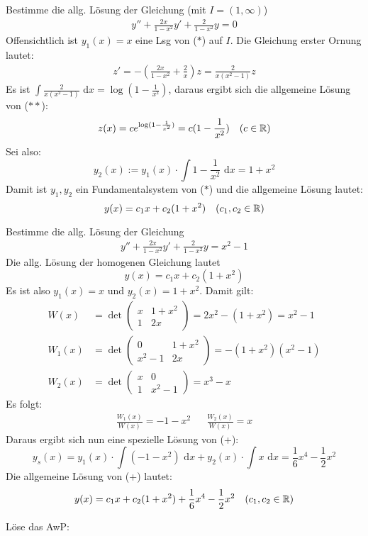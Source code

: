 \documentclass[a4paper,twoside,DIV15,BCOR12mm,chapterprefix=true,headings=twolinechapter]{scrbook}
\begin{document}
\begin{beispiele}
\item Bestimme die allg. Lösung der Gleichung (mit $I=(1,\infty)$)
\begin{align*}
\tag{$*$} y''+\frac{2x}{1-x^2}y'+\frac{2}{1-x^2}y=0
\end{align*}
Offensichtlich ist $y_1(x)=x$ eine Lsg von ($*$) auf $I$. Die Gleichung erster Ornung lautet:
\begin{align*}
\tag{$**$} z'=-\left(\frac{2x}{1-x^2}+\frac 2x\right)z=\frac 2{x(x^2-1)} z
\end{align*}
Es ist $\int\frac2{x(x^2-1)}\text{ d}x=\log(1-\frac1{x^2})$, daraus ergibt sich die allgemeine
Lösung von ($**$):
\[z(x)=ce^{\log(1-\frac1{x^2})}=c(1-\frac1{x^2})\quad (c\in\mathbb{R})\]
Sei also:
\[y_2(x):=y_1(x)\cdot\int 1-\frac1{x^2}\text{ d}x=1+x^2\]
Damit ist $y_1,y_2$ ein Fundamentalsystem von ($*$) und die allgemeine Lösung lautet:
\[y(x)=c_1x+c_2(1+x^2)\quad (c_1,c_2\in\mathbb{R})\]
\item Bestimme die allg. Lösung der Gleichung
\begin{align*}
\tag{+} y''+\frac{2x}{1-x^2}y'+\frac{2}{1-x^2}y=x^2-1
\end{align*}
Die allg. Lösung der homogenen Gleichung lautet
\[y(x)=c_1x+c_2(1+x^2)\]
Es ist also $y_1(x)=x$ und $y_2(x)=1+x^2$. Damit gilt:
\begin{align*}
W(x)&=\det\begin{pmatrix}
x&1+x^2\\
1&2x
\end{pmatrix}=2x^2-(1+x^2)=x^2-1\\
W_1(x)&=\det\begin{pmatrix}
0&1+x^2\\
x^2-1&2x
\end{pmatrix}=-(1+x^2)(x^2-1)\\
W_2(x)&=\det\begin{pmatrix}
x&0\\
1&x^2-1	
\end{pmatrix}=x^3-x
\end{align*}
Es folgt:
\begin{align*}
\frac{W_1(x)}{W(x)}=-1-x^2 &&\frac{W_2(x)}{W(x)}=x  
\end{align*}
Daraus ergibt sich nun eine spezielle Lösung von (+):
\[y_s(x)=y_1(x)\cdot\int(-1-x^2)\text{ d}x+y_2(x)\cdot\int x\text{ d}x=\frac16 x^4-\frac12 x^2\]
Die allgemeine Lösung von (+) lautet:
\[y(x)=c_1x+c_2(1+x^2)+\frac16 x^4-\frac12 x^2\quad (c_1,c_2\in\mathbb{R})\]
\item Löse das AwP:

\end{beispiele}
\end{document}
